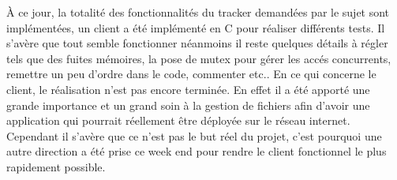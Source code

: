 À ce jour, la totalité des fonctionnalités du tracker demandées par le sujet sont implémentées, un client a été implémenté en C pour réaliser différents tests. Il s'avère que tout semble fonctionner néanmoins il reste quelques détails à régler tels que des fuites mémoires, la pose de mutex pour gérer les accés concurrents, remettre un peu d'ordre dans le code, commenter etc..
En ce qui concerne le client, le réalisation n'est pas encore terminée. En effet il a été apporté une grande importance et un grand soin à la gestion de fichiers afin d'avoir une application qui pourrait réellement être déployée sur le réseau internet. Cependant il s'avère que ce n'est pas le but réel du projet, c'est pourquoi une autre direction a été prise ce week end pour rendre le client fonctionnel le plus rapidement possible.
